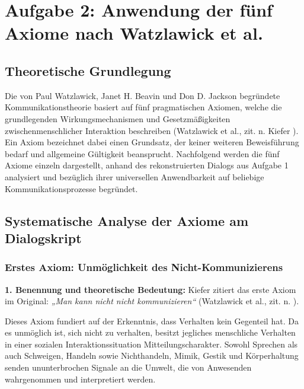 
\chapter{Aufgabe 2: Anwendung der fünf Axiome nach Watzlawick et al.} 
\label{sec:aufgabe2}

\section{Theoretische Grundlegung}
Die von Paul Watzlawick, Janet H. Beavin und Don D. Jackson begründete Kommunikationstheorie basiert auf fünf pragmatischen Axiomen, welche die grundlegenden Wirkungsmechanismen und Gesetzmäßigkeiten zwischenmenschlicher Interaktion beschreiben (Watzlawick et al., zit. n. Kiefer \cite[S.~11--16]{3}). Ein Axiom bezeichnet dabei einen Grundsatz, der keiner weiteren Beweisführung bedarf und allgemeine Gültigkeit beansprucht. Nachfolgend werden die fünf Axiome einzeln dargestellt, anhand des rekonstruierten Dialogs aus Aufgabe 1 analysiert und bezüglich ihrer universellen Anwendbarkeit auf beliebige Kommunikationsprozesse begründet.

\section{Systematische Analyse der Axiome am Dialogskript}

\subsection{Erstes Axiom: Unmöglichkeit des Nicht-Kommunizierens}

\textbf{1. Benennung und theoretische Bedeutung:}
Kiefer zitiert das erste Axiom im Original: \textit{„Man kann nicht nicht kommunizieren“} (Watzlawick et al., zit. n. \cite[S.~11--12]{3}).

Dieses Axiom fundiert auf der Erkenntnis, dass Verhalten kein Gegenteil hat. Da es unmöglich ist, sich nicht zu verhalten, besitzt jegliches menschliche Verhalten in einer sozialen Interaktionssituation Mitteilungscharakter. Sowohl Sprechen als auch Schweigen, Handeln sowie Nichthandeln, Mimik, Gestik und Körperhaltung senden ununterbrochen Signale an die Umwelt, die von Anwesenden wahrgenommen und interpretiert werden.

